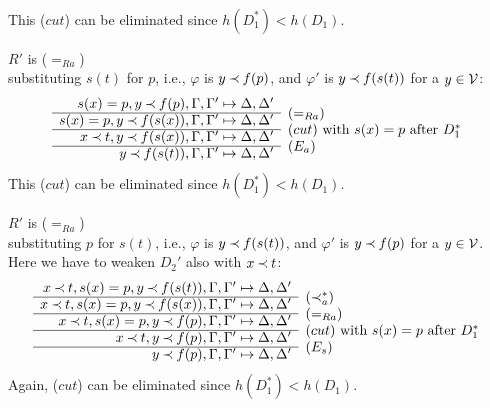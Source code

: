 \begin{PROOF}
\begin{LS}
\begin{LSA}
\begin{LSB}
\begin{LSC}
\begin{LSD}
\[\begin{array}{rl}
\end{array} \]
This ($cut$) can be eliminated since $h(D_1^*)<h(D_1)$.
%
\item $R'$ is ($=_{Ra}$)\\
substituting $s(t)$ for $p$, i.e., $\varphi$ is $y\mathbin{\prec} f(p)$, and $\varphi'$ is
$y\mathbin{\prec} f(s(t))$ for a $y\in{\cal V}$:
\[ \begin{array}{rl}
 s(x)=p, y\Incl f(p), \Gamma, \Gamma' \Seq \Delta, \Delta' \\
 \cline{1-1}
 s(x)=p, y\Incl f(s(x)), \Gamma, \Gamma' \Seq \Delta, \Delta' 
 &   \raisebox{1.2ex}[1.5ex][0ex]{($=_{Ra}$)} \\ \cline{1-1}
x\Incl t, y\Incl f(s(x)), \Gamma, \Gamma' \Seq \Delta, \Delta' 
 &   \raisebox{1.2ex}[1.5ex][0ex]{($cut$)\ with\ $s(x)=p$\ after\ $D_1^*$} \\ \cline{1-1}
y\Incl f(s(t)), \Gamma, \Gamma' \Seq \Delta, \Delta' 
 &   \raisebox{1.2ex}[1.5ex][0ex]{($E_a$)}
\end{array} \]
This ($cut$) can be eliminated since $h(D_1^*)<h(D_1)$.
\item $R'$ is ($=_{Ra}$)\\
substituting $p$ for $s(t)$, i.e., $\varphi$ is $y\mathbin{\prec} f(s(t))$, and $\varphi'$ is
 $y\mathbin{\prec} f(p)$ for a $y\in{\cal V}$. Here we have to weaken $D_2'$ also with $x\mathbin{\prec} t$:
\[ \begin{array}{rl}
 x\Incl t, s(x)=p, y\Incl f(s(t)), \Gamma, \Gamma' \Seq \Delta, \Delta' \\
 \cline{1-1}
x\Incl t, s(x)=p, y\Incl f(s(x)), \Gamma, \Gamma' \Seq \Delta, \Delta' 
 &   \raisebox{1.2ex}[1.5ex][0ex]{($\Incl_a^*$)} \\ \cline{1-1}
x\Incl t, s(x)=p, y\Incl f(p), \Gamma, \Gamma' \Seq \Delta, \Delta' 
 &   \raisebox{1.2ex}[1.5ex][0ex]{($=_{Ra}$)} \\ \cline{1-1}
x\Incl t, y\Incl f(p), \Gamma, \Gamma' \Seq \Delta, \Delta' 
 &   \raisebox{1.2ex}[1.5ex][0ex]{($cut$)\ with\ $s(x)=p$\ after\ $D_1^*$} \\ \cline{1-1}
y\Incl f(p), \Gamma, \Gamma' \Seq \Delta, \Delta' 
 &   \raisebox{1.2ex}[1.5ex][0ex]{($E_s$)}
\end{array} \]
Again, ($cut$) can be eliminated since $h(D_1^*)<h(D_1)$.
\end{LSD}
\end{LSC}
\end{LSB}
\end{LSA}
\end{LS}
\end{PROOF}
